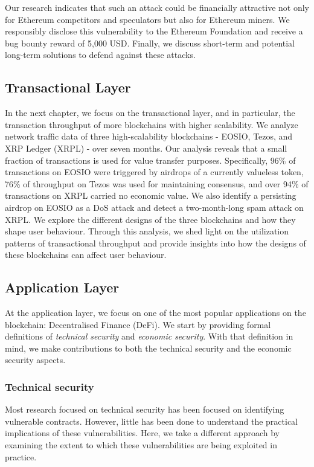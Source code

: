 Our research indicates that such an attack could be financially attractive not only for Ethereum competitors and speculators but also for Ethereum miners. We responsibly disclose this vulnerability to the Ethereum Foundation and receive a bug bounty reward of 5,000 USD. Finally, we discuss short-term and potential long-term solutions to defend against these attacks.

\subsection{Transactional Layer}
In the next chapter, we focus on the transactional layer, and in particular, the transaction throughput of more blockchains with higher scalability.
We analyze network traffic data of three high-scalability blockchains - EOSIO, Tezos, and XRP Ledger (XRPL) - over seven months.
Our analysis reveals that a small fraction of transactions is used for value transfer purposes.
Specifically, 96\% of transactions on EOSIO were triggered by airdrops of a currently valueless token, 76\% of throughput on Tezos was used for maintaining consensus, and over 94\% of transactions on XRPL carried no economic value. We also identify a persisting airdrop on EOSIO as a DoS attack and detect a two-month-long spam attack on XRPL.
We explore the different designs of the three blockchains and how they shape user behaviour.
Through this analysis, we shed light on the utilization patterns of transactional throughput and provide insights into how the designs of these blockchains can affect user behaviour.

\subsection{Application Layer}
At the application layer, we focus on one of the most popular applications on the blockchain: Decentralised Finance (DeFi).
We start by providing formal definitions of \emph{technical security} and \emph{economic security}.
With that definition in mind, we make contributions to both the technical security and the economic security aspects.

\subsubsection{Technical security}

Most research focused on technical security has been focused on identifying vulnerable contracts.
However, little has been done to understand the practical implications of these vulnerabilities.
Here, we take a different approach by examining the extent to which these vulnerabilities are being exploited in practice.

